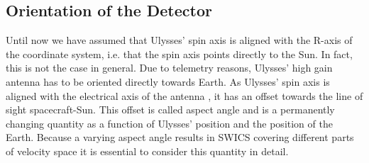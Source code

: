 \subsection{Orientation of the Detector}
Until now we have assumed that Ulysses' spin axis is aligned with the R-axis of the coordinate system, i.e. that the spin axis points directly to the Sun. In fact, this is not the case in general. Due to telemetry reasons, Ulysses' high gain antenna has to be oriented directly towards Earth. As Ulysses' spin axis is aligned with the electrical axis of the antenna \citep{wenzel_ulysses}, it has an offset towards the line of sight spacecraft-Sun. This offset is called aspect angle and is a permanently changing quantity as a function of Ulysses' position and the position of the Earth. Because a varying aspect angle results in SWICS covering different parts of velocity space it is essential to consider this quantity in detail.
%
%
